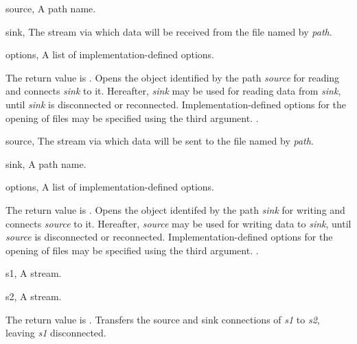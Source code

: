 \begin{optDefinition}
\begin{specargs}
    \item[source, \theclass{path}] A path name.
    \item[sink, \classref{file-stream}] The stream via which data will be
    received from the file named by {\em path}.
    \item[options, \classref{list}] A list of implementation-defined options.
\end{specargs}
%
\result%
The return value is \nil.
%
\remarks%
Opens the object identified by the path {\em source\/} for reading and
connects {\em sink\/} to it. Hereafter, {\em sink\/} may be used for reading
data from {\em sink\/}, until {\em sink\/} is disconnected or
reconnected. Implementation-defined options for the opening of files may be
specified using the third argument.
%
\seealso%
.

\begin{specargs}
    \item[source, \classref{file-stream}] The stream via which data will be sent
    to the file named by {\em path}.
    \item[sink, \theclass{path}] A path name.
    \item[options, \classref{list}] A list of implementation-defined options.
\end{specargs}
%
\result%
The return value is \nil.
%
\remarks%
Opens the object identifed by the path {\em sink\/} for writing and
connects {\em source\/} to it. Hereafter, {\em source\/} may be used for writing
data to {\em sink}, until {\em source\/} is disconnected or
reconnected. Implementation-defined options for the opening of files may be
specified using the third argument.
%
\seealso%
.

\begin{genericargs}
    \item[s1, \classref{stream}] A stream.
    \item[s2, \classref{stream}] A stream.
\end{genericargs}
%
\result%
The return value is \nil.
%
\remarks%
Transfers the source and sink connections of {\em s1\/} to {\em s2},
leaving {\em s1\/} disconnected.


\end{optDefinition}

